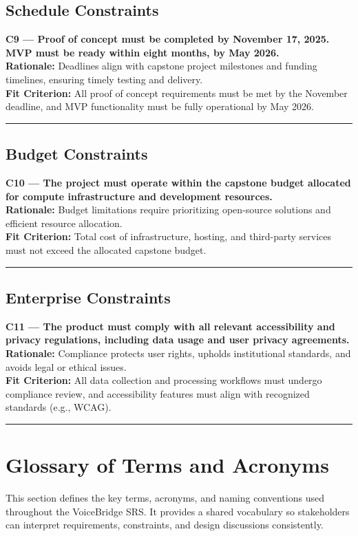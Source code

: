 \documentclass[11pt]{article}
\begin{document}
\subsection{Schedule Constraints}

\noindent\textbf{C9 — Proof of concept must be completed by November 17, 2025. MVP must be ready within eight months, by May 2026.}\\
\textbf{Rationale:} Deadlines align with capstone project milestones and funding timelines, ensuring timely testing and delivery.\\
\textbf{Fit Criterion:} All proof of concept requirements must be met by the November deadline, and MVP functionality must be fully operational by May 2026.
\par\noindent\rule{\textwidth}{0.4pt}


\subsection{Budget Constraints}

\noindent\textbf{C10 — The project must operate within the capstone budget allocated for compute infrastructure and development resources.}\\
\textbf{Rationale:} Budget limitations require prioritizing open-source solutions and efficient resource allocation.\\
\textbf{Fit Criterion:} Total cost of infrastructure, hosting, and third-party services must not exceed the allocated capstone budget.
\par\noindent\rule{\textwidth}{0.4pt}


\subsection{Enterprise Constraints}

\noindent\textbf{C11 — The product must comply with all relevant accessibility and privacy regulations, including data usage and user privacy agreements.}\\
\textbf{Rationale:} Compliance protects user rights, upholds institutional standards, and avoids legal or ethical issues.\\
\textbf{Fit Criterion:} All data collection and processing workflows must undergo compliance review, and accessibility features must align with recognized standards (e.g., WCAG).
\par\noindent\rule{\textwidth}{0.4pt}


\section*{Glossary of Terms and Acronyms}
This section defines the key terms, acronyms, and naming conventions used throughout the VoiceBridge SRS. It provides a shared vocabulary so stakeholders can interpret requirements, constraints, and design discussions consistently.
\end{document}

